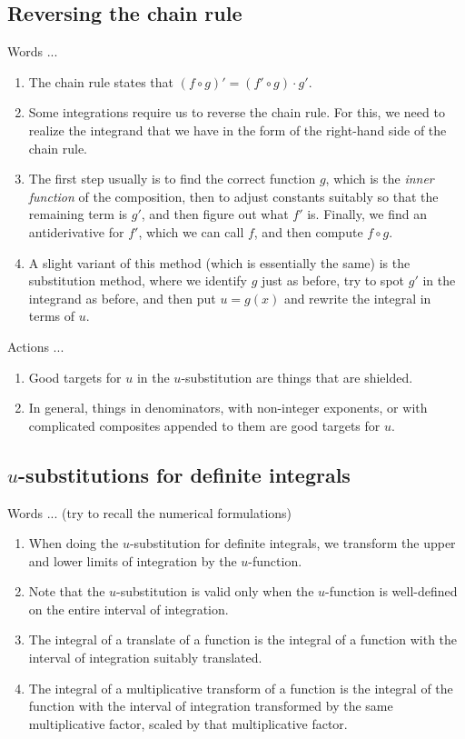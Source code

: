 \documentclass[10pt]{amsart}
\begin{document}
\subsection{Reversing the chain rule}

Words ...

\begin{enumerate}
\item The chain rule states that $(f \circ g)' = (f' \circ g) \cdot
  g'$.
\item Some integrations require us to reverse the chain rule. For
  this, we need to realize the integrand that we have in the form of the
  right-hand side of the chain rule.
\item The first step usually is to find the correct function $g$,
  which is the {\em inner function} of the composition, then to adjust
  constants suitably so that the remaining term is $g'$, and then
  figure out what $f'$ is. Finally, we find an antiderivative for
  $f'$, which we can call $f$, and then compute $f \circ g$.
\item A slight variant of this method (which is essentially the same)
  is the substitution method, where we identify $g$ just as before,
  try to spot $g'$ in the integrand as before, and then put $u = g(x)$
  and rewrite the integral in terms of $u$.
\end{enumerate}

Actions ...

\begin{enumerate}
\item Good targets for $u$ in the $u$-substitution are things that are
  shielded.
\item In general, things in denominators, with non-integer exponents,
  or with complicated composites appended to them are good targets for
  $u$.
\end{enumerate}

\subsection{$u$-substitutions for definite integrals}

Words ... (try to recall the numerical formulations)

\begin{enumerate}
\item When doing the $u$-substitution for definite integrals, we
  transform the upper and lower limits of integration by the
  $u$-function.
\item Note that the $u$-substitution is valid only when the
  $u$-function is well-defined on the entire interval of integration.
\item The integral of a translate of a function is the integral of a
  function with the interval of integration suitably translated.
\item The integral of a multiplicative transform of a function is the
  integral of the function with the interval of integration
  transformed by the same multiplicative factor, scaled by that
  multiplicative factor.
\end{enumerate}
\end{document}
